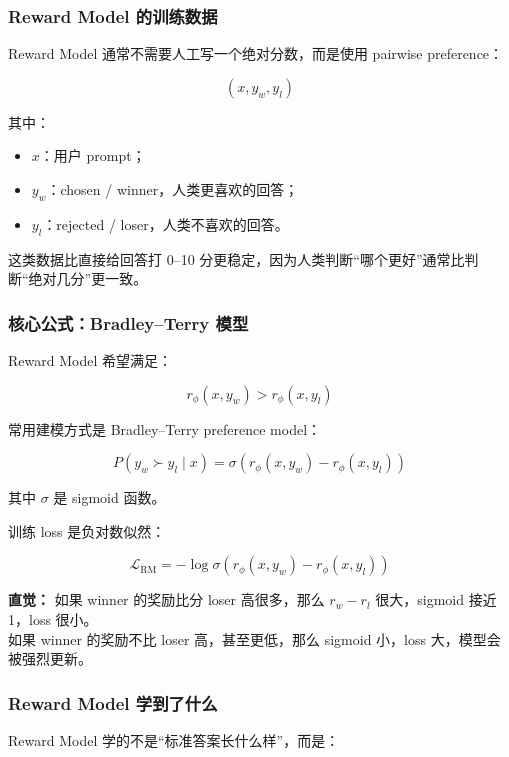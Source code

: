 \subsubsection{Reward Model 的训练数据}

Reward Model 通常不需要人工写一个绝对分数，而是使用 pairwise preference：

\[
(x, y_w, y_l)
\]

其中：

\begin{itemize}[leftmargin=1.5em]
  \item $x$：用户 prompt；
  \item $y_w$：chosen / winner，人类更喜欢的回答；
  \item $y_l$：rejected / loser，人类不喜欢的回答。
\end{itemize}

这类数据比直接给回答打 0--10 分更稳定，因为人类判断“哪个更好”通常比判断“绝对几分”更一致。

\subsubsection{核心公式：Bradley--Terry 模型}

Reward Model 希望满足：

\[
r_\phi(x, y_w) > r_\phi(x, y_l)
\]

常用建模方式是 Bradley--Terry preference model：

\[
P(y_w \succ y_l \mid x)
=
\sigma\left(r_\phi(x, y_w) - r_\phi(x, y_l)\right)
\]

其中 $\sigma$ 是 sigmoid 函数。

训练 loss 是负对数似然：

\[
\mathcal{L}_\text{RM}
=
-
\log
\sigma\left(r_\phi(x, y_w) - r_\phi(x, y_l)\right)
\]

\begin{intubox}
\textbf{直觉：} 如果 winner 的奖励比分 loser 高很多，那么 $r_w - r_l$ 很大，sigmoid 接近 1，loss 很小。\\
如果 winner 的奖励不比 loser 高，甚至更低，那么 sigmoid 小，loss 大，模型会被强烈更新。
\end{intubox}

\subsubsection{Reward Model 学到了什么}

Reward Model 学的不是“标准答案长什么样”，而是：

